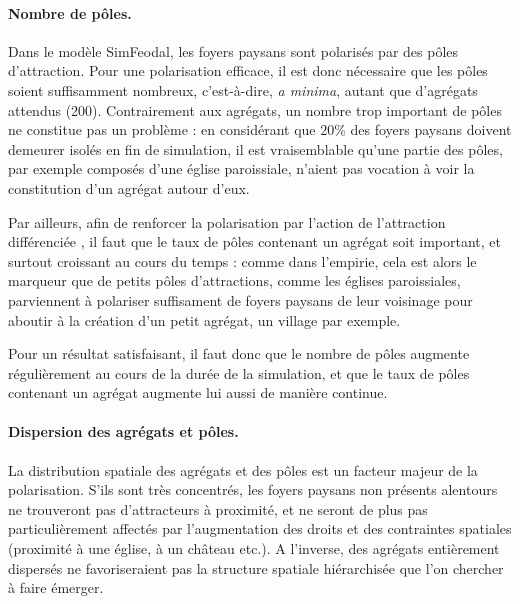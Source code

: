 \paragraph{Nombre de pôles.}\label{par:nb-poles}

Dans le modèle SimFeodal, les foyers paysans sont polarisés par des pôles d'attraction.
Pour une polarisation efficace, il est donc nécessaire que les pôles soient suffisamment nombreux, c'est-à-dire, \textit{a minima}, autant que d'agrégats attendus (200).
Contrairement aux agrégats, un nombre trop important de pôles ne constitue pas un problème :
	en considérant que $20\%$ des foyers paysans doivent demeurer isolés en fin de simulation, il est vraisemblable qu'une partie des pôles, par exemple composés d'une église paroissiale, n'aient pas vocation à voir la constitution d'un agrégat autour d'eux.

Par ailleurs, afin de renforcer la polarisation par l'action de l'attraction différenciée
, il faut que le taux de pôles contenant un agrégat soit important, et surtout croissant au cours du temps :
comme dans l'empirie, cela est alors le marqueur que de petits pôles d'attractions, comme les églises paroissiales, parviennent à polariser suffisament de foyers paysans de leur voisinage pour aboutir à la création d'un petit agrégat, un village par exemple.

Pour un résultat satisfaisant, il faut donc que le nombre de pôles augmente régulièrement au cours de la durée de la simulation, et que le taux de pôles contenant un agrégat augmente lui aussi de manière continue.

\paragraph{Dispersion des agrégats et pôles.}\label{par:polarisation-dispersion}

La distribution spatiale des agrégats et des pôles est un facteur majeur de la polarisation.
S'ils sont très concentrés, les foyers paysans non présents alentours ne trouveront pas d'attracteurs à proximité, et ne seront de plus pas particulièrement affectés par l'augmentation des droits et des contraintes spatiales (proximité à une église, à un château etc.).
A l'inverse, des agrégats entièrement dispersés ne favoriseraient pas la structure spatiale hiérarchisée que l'on chercher à faire émerger.

